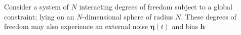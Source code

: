 Consider a system of $N$ interacting degrees of freedom subject to a global constraint; lying on an $N$-dimensional sphere of radius $N$. These degrees of freedom may also experience an external noise $\mathbf{\eta}(t)$ and bias $\mathbf{h}$